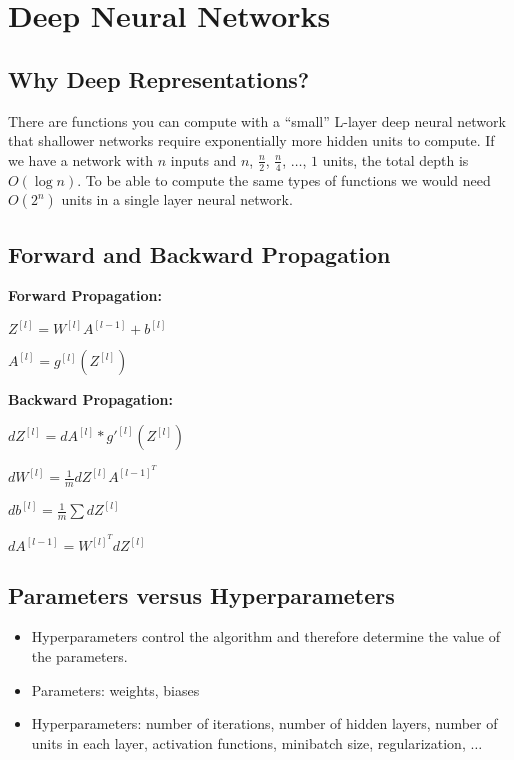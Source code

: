 \section{Deep Neural Networks}

\subsection{Why Deep Representations?}

There are functions you can compute with a “small” L-layer deep neural network that shallower networks require exponentially more hidden units to compute. If we have a network with $n$ inputs and $n$, $\frac{n}{2}$, $\frac{n}{4}$, $\dots$, $1$ units, the total depth is $O (\log n)$. To be able to compute the same types of functions we would need $O(2^n)$ units in a single layer neural network.

\subsection{Forward and Backward Propagation}

\textbf{Forward Propagation:}

$Z^{[l]} =  W^{[l]} A^{[l-1]} + b^{[l]}$

$A^{[l]} = g^{[l]}(Z^{[l]})$

\textbf{Backward Propagation:}

$dZ^{[l]} = dA^{[l]} * g'^{[l]} (Z^{[l]})$

$dW^{[l]} = \frac{1}{m} dZ^{[l]} A^{[l-1]^T}$

$db^{[l]} = \frac{1}{m} \sum dZ^{[l]}$

$dA^{[l-1]} = W^{[l]^T} dZ^{[l]}$

\subsection{Parameters versus Hyperparameters}

\begin{itemize}[wide, labelwidth=!, labelindent=0pt]
\itemsep0em 
    \item Hyperparameters control the algorithm and therefore determine the value of the parameters.
    \item Parameters: weights, biases
    \item Hyperparameters: number of iterations, number of hidden layers, number of units in each layer, activation functions, minibatch size, regularization, $\dots$ \vspace*{-\baselineskip}
\end{itemize}

